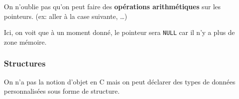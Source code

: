 On n'oublie pas qu'on peut faire des \textbf{opérations arithmétiques}
sur les pointeurs. (ex: aller à la case suivante, \ldots)

\begin{Shaded}
\begin{Highlighting}[]
\OperatorTok{(}\OperatorTok{,}  \OperatorTok{**}\OperatorTok{)} \OperatorTok{\{} 
    
     \OperatorTok{**}\OperatorTok{;}\OperatorTok{=}\OperatorTok{;} 
\OperatorTok{(}\OperatorTok{);} 
    \OperatorTok{(*}\OperatorTok{!=}\OperatorTok{)} \OperatorTok{\{} 
\OperatorTok{(}\OperatorTok{,*}\OperatorTok{);} 
\OperatorTok{++;}
    \OperatorTok{\}}
\OperatorTok{(}\OperatorTok{);}
    \OperatorTok{(}\OperatorTok{);}
\OperatorTok{\}}
\end{Highlighting}
\end{Shaded}

Ici, on voit que à un moment donné, le pointeur sera \texttt{NULL} car
il n'y a plus de zone mémoire.

\subsubsection{Structures}\label{structures}

On n'a pas la notion d'objet en C mais on peut déclarer des types de
données personnalisées sous forme de structure.

\begin{Shaded}
\begin{Highlighting}[]
\OperatorTok{\{}
    \OperatorTok{;}
    \OperatorTok{;}
    \OperatorTok{;}
\OperatorTok{\}}

\OperatorTok{=} \OperatorTok{\{}\OperatorTok{,} \OperatorTok{,} \OperatorTok{\};}
\OperatorTok{;}\OperatorTok{;}\OperatorTok{;}
\end{Highlighting}
\end{Shaded}

